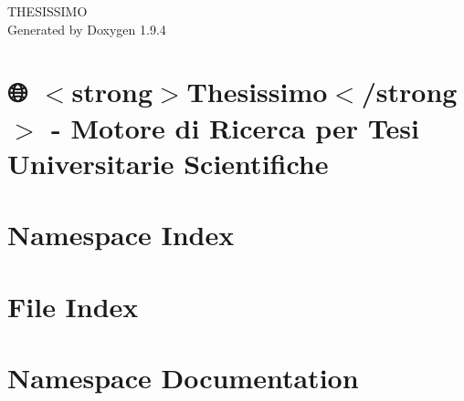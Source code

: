 \documentclass[twoside]{book}
\newcommand{\+}{\discretionary{\mbox{\scriptsize$\hookleftarrow$}}{}{}}
\newcommand{\clearemptydoublepage}{%
    \newpage{\pagestyle{empty}\cleardoublepage}%
  }
\begin{document}
  \raggedbottom
    \hypersetup{pageanchor=false,
                bookmarksnumbered=true,
                pdfencoding=unicode
               }
  \begin{titlepage}
  \vspace*{7cm}
  \begin{center}%
  {\Large THESISSIMO}\\
  \vspace*{1cm}
  {\large Generated by Doxygen 1.9.4}\\
  \end{center}
  \end{titlepage}
  \clearemptydoublepage
  \tableofcontents
  \clearemptydoublepage
  \hypersetup{pageanchor=true}
\chapter{🌐 \texorpdfstring{$<$}{<}strong\texorpdfstring{$>$}{>}Thesissimo\texorpdfstring{$<$}{<}/strong\texorpdfstring{$>$}{>} -\/ Motore di Ricerca per Tesi Universitarie Scientifiche}
\label{md__root_JuriScan_README}

\chapter{Namespace Index}

\chapter{File Index}

\chapter{Namespace Documentation}





















\end{document}
